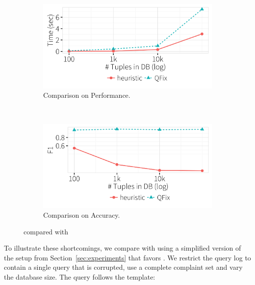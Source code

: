   \begin{figure}[h!]
  \centering
    \begin{subfigure} [t]{.75\columnwidth}
    \includegraphics[width = \columnwidth]{figures/heuristictime}
    \caption{Comparison on Performance. }
    \label{f:heuristic_time} 
    \end{subfigure}\\

    \begin{subfigure} [t]{.75\columnwidth}
    \includegraphics[width = \columnwidth]{figures/heuristicacc}
    \caption{Comparison on Accuracy. }
    \label{f:heuristic_acc} 
    \end{subfigure}
    \label{f:heuristic}
   \caption{\dt compared with \sys}
  \end{figure}


To illustrate these shortcomings, we compare \dt with \sys using a simplified version of the setup from Section~\ref{sec:experiments} that favors \dt.
We restrict the query log to contain a single query that is corrupted, use a complete complaint set  and vary the database size.
The query follows the template:

